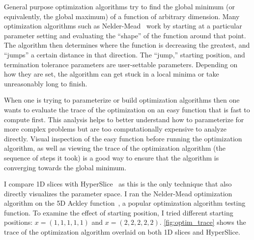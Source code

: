 General purpose optimization algorithms try to find the global minimum (or
equivalently, the global maximum) of a function of arbitrary dimension.  Many
optimization algorithms such as Nelder-Mead~\cite{Nelder:1965} work by starting
at a particular parameter setting and evaluating the ``shape'' of the function
around that point.  The algorithm then determines where the function is
decreasing the greatest, and ``jumps'' a certain distance in that direction.
The ``jump,'' starting position, and termination tolerance parameters are
user-settable parameters. Depending on how they are set, the algorithm can get
stuck in a local minima or take unreasonably long to finish.

When one is trying to parameterize or build optimization algorithms then
one wants to evaluate the trace of the optimization on an easy function
that is fast to compute first. This analysis helps to better understand how to parameterize for more complex problems
but are
too computationally expensive to analyze directly. 
Visual inspection of the easy function before running the optimization algorithm, as well as
viewing the trace of the optimization algorithm (the sequence of steps it took) is a good way to ensure that the algorithm is converging towards the global
minimum. 

I compare 1D slices with HyperSlice~\cite{Wijk:1993} as this is the only
technique that also directly visualizes the parameter space.  I ran the
Nelder-Mead optimization algorithm on the 5D Ackley
function~\cite{Ackley:1987}, a popular optimization algorithm testing function.
To examine the effect of starting position, I tried different starting
positions: \(x=(1,1,1,1,1)\) and \(x=(2,2,2,2,2)\).  \autoref{fig:optim_trace}
shows the trace of the optimization algorithm overlaid on both 1D slices and
HyperSlice.

